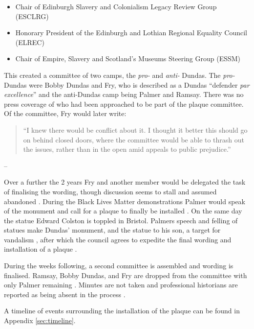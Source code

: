 \documentclass{scrartcl}
\renewcommand{\cite}{\parencite}
\providecommand{\tightlist}{%
  \setlength{\itemsep}{0pt}\setlength{\parskip}{0pt}}
\begin{document}
\begin{itemize}
    \tightlist
    \item Chair of Edinburgh Slavery and Colonialism Legacy Review Group (ESCLRG)
    \item Honorary President of the Edinburgh and Lothian Regional Equality Council (ELREC)  
    \item Chair of Empire, Slavery and Scotland’s Museums Steering Group (ESSM)
\end{itemize}

This created a committee of two camps, the \textit{pro-} and \textit{anti-} Dundas. The \textit{pro-} Dundas were Bobby Dundas and Fry, who is described as a Dundas ``defender \textit{par excellence}'' \cite[][]{mccarthy_2022_1} and the anti-Dundas camp being Palmer and Ramsay. There was no press coverage of who had been approached to be part of the plaque committee. Of the committee, Fry would later write:

\begin{quotation}
``I knew there would be conflict about it. I thought it better this should go on behind closed doors, where the committee would be able to thrash out the issues, rather than in the open amid appeals to public prejudice.''
\end{quotation}
\begin{flushright}
    -- \cite[][]{fry_2020}
\end{flushright}

Over a further the 2 years Fry and another member would be delegated the task of finalising the wording, though discussion seems to stall and assumed abandoned \cite[][]{fry_2020}. During the Black Lives Matter demonstrations Palmer would speak of the monument and call for a plaque to finally be installed \cite[][]{youtube_2020}. On the same day the statue Edward Colston is toppled in Bristol. Palmers speech and felling of statues make Dundas' monument, and the statue to his son, a target for vandalism \cite[][]{hay_2020_3}, after which the council agrees to expedite the final wording and installation of a plaque \cite[][]{council_2020}. 

During the weeks following, a second committee is assembled and wording is finalised. Ramsay, Bobby Dundas, and Fry are dropped from the committee with only Palmer remaining \cite[][]{lloyd_2022}. Minutes are not taken \cite[][]{mccarthy_2022_2} and professional historians are reported as being absent in the process \cite[][]{scotsman_2022}.


A timeline of events surrounding the installation of the plaque can be found in Appendix \ref{sec:timeline}.
\end{document}

